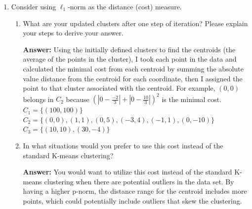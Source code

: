 \documentclass{assignment}
\begin{document}
\begin{problem}
\begin{enumerate}
\begin{enumerate}[label=(\alph*)]

        
        \item Consider using $\ell_1$-norm as the distance (cost) measure.

        \begin{enumerate}[label=\roman*.]

        
            \item What are your updated clusters after one step of iteration? Please explain your steps to derive your answer.

            \color{blue}\textbf{Answer:} Using the initially defined clusters to find the centroids (the average of the points in the cluster), I took each point in the data and calculated the minimal cost from each centroid by summing the absolute value distance from the centroid for each coordinate, then I assigned the point to that cluster associated with the centroid. For example, $(0,0)$ belongs in $C_2$ because $(|0-\frac{-2}{3}| + |0-\frac{10}{3}|)^2$ is the minimal cost.\\
            $C_1 = \{(100,100)\}$\\
            $C_2 = \{(0,0), (1,1), (0,5), (-3,4), (-1,1), (0,-10)\}$\\
            $C_3 = \{(10,10), (30,-4)\}$ \color{black}


        
            \item In what situations would you prefer to use this cost instead of the standard K-means clustering?

            \color{blue}\textbf{Answer:} You would want to utilize this cost instead of the standard K-means clustering when there are potential outliers in the data set. By having a higher p-norm, the distance range for the centroid includes more points, which could potentially include outliers that skew the clustering. \color{black}



\end{enumerate}
\end{enumerate}
\end{enumerate}
\end{problem}
\end{document}
